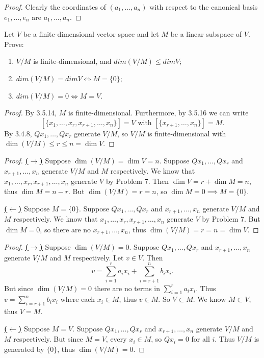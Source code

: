\begin{proof}
    Clearly the coordinates of $(a_1, \ldots, a_n)$ with respect to the canonical basis $e_1, \ldots, e_n$ are $a_1, \ldots, a_n$.
\end{proof}


\begin{tcolorbox}[title=Problem 9, breakable]
    Let $V$ be a finite-dimensional vector space and let $M$ be a linear subspace of $V$. Prove:
    \begin{enumerate}
        \item $V/M$ is finite-dimensional, and $dim(V/M) \le dim V$;
        \item $dim(V/M) = dim V \iff M = \{0\}$;
        \item $dim(V/M) = 0 \iff M = V$.
    \end{enumerate}
\end{tcolorbox}

\begin{proof}
    By 3.5.14, $M$ is finite-dimensional.
    Furthermore, by 3.5.16 we can write
    \[[\{x_1, \ldots, x_r, x_{r+1}, \ldots, x_n\}] = V \text{ with } [\{x_{r+1}, \ldots, x_n\}] = M.\]
    By 3.4.8, $Qx_1, \ldots, Qx_r$ generate $V/M$, 
        so $V/M$ is finite-dimensional with $\dim(V/M) \le r \le n = \dim V$.
\end{proof}

\begin{proof}
    \underline{\textbf{($\longrightarrow$)}}
    Suppose $\dim(V/M) = \dim V = n$.
    Suppose $Qx_1, \ldots, Qx_r$ and $x_{r+1}, \ldots, x_n$ generate $V/M$ and $M$ respectively.
    We know that $x_1, \ldots, x_r, x_{r+1}, \ldots, x_n$ generate $V$ by Problem 7.
    Then $\dim V = r + \dim M = n$, thus $\dim M = n - r$. But $\dim(V/M) = r = n$,
    so $\dim M = 0 \implies M = \{0\}$.

    \underline{\textbf{($\longleftarrow$)}}
    Suppose $M = \{0\}$.
    Suppose $Qx_1, \ldots, Qx_r$ and $x_{r+1}, \ldots, x_n$ generate $V/M$ and $M$ respectively.
    We know that $x_1, \ldots, x_r, x_{r+1}, \ldots, x_n$ generate $V$ by Problem 7.
    But $\dim M = 0$, so there are no $x_{r+1}, \ldots, x_n$, thus $\dim(V/M) = r = n = \dim V$.
\end{proof}

\begin{proof}
    \underline{\textbf{($\longrightarrow$)}}
    Suppose $\dim(V/M) = 0$.
    Suppose $Qx_1, \ldots, Qx_r$ and $x_{r+1}, \ldots, x_n$ generate $V/M$ and $M$ respectively.
    Let $v \in V$. Then
    \[v = \sum_{i=1}^r a_i x_i + \sum_{i=r+1}^n b_i x_i.\]
    But since $\dim(V/M) = 0$ there are no terms in $\sum_{i=1}^r a_i x_i$.
    Thus $v = \sum_{i=r+1}^n b_i x_i$ where each $x_i \in M$, thus $v \in M$.
    So $V \subset M$. We know $M \subset V$, thus $V = M$.

    \underline{\textbf{($\longleftarrow$)}}
    Suppose $M = V$.
    Suppose $Qx_1, \ldots, Qx_r$ and $x_{r+1}, \ldots, x_n$ generate $V/M$ and $M$ respectively.
    But since $M = V$, every $x_i \in M$, so $Qx_i = 0$ for all $i$.
    Thus $V/M$ is generated by $\{0\}$, thus $\dim(V/M) = 0$.
\end{proof}

